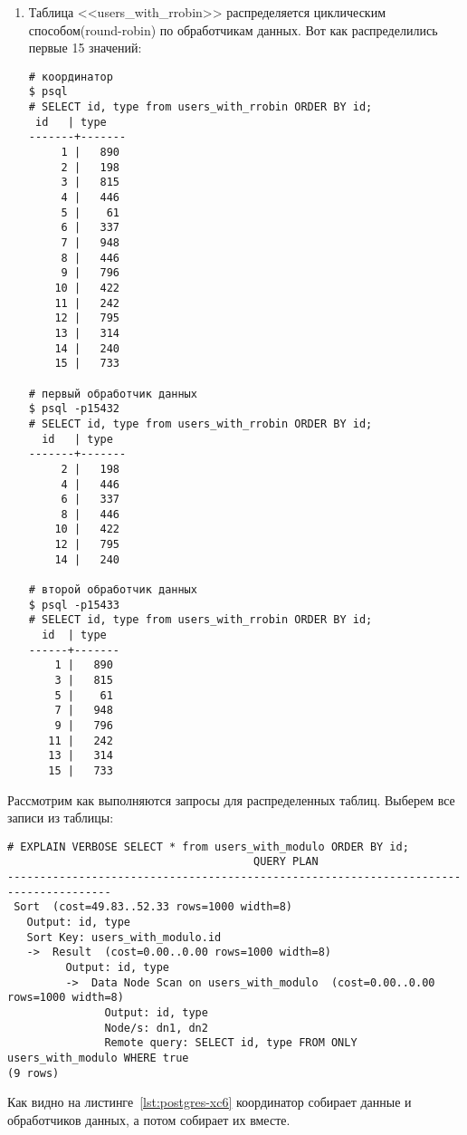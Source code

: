 \begin{enumerate}
\item Таблица <<users\_with\_rrobin>> распределяется циклическим способом(round-robin) по обработчикам данных. Вот как распределились первые 15 значений:

\begin{lstlisting}[label=lst:postgres-xc5,caption=Данные с координатора и обработчиков данных]
# координатор
$ psql
# SELECT id, type from users_with_rrobin ORDER BY id;
 id   | type  
-------+-------
     1 |   890
     2 |   198
     3 |   815
     4 |   446
     5 |    61
     6 |   337
     7 |   948
     8 |   446
     9 |   796
    10 |   422
    11 |   242
    12 |   795
    13 |   314
    14 |   240
    15 |   733

# первый обработчик данных
$ psql -p15432
# SELECT id, type from users_with_rrobin ORDER BY id;
  id   | type  
-------+-------
     2 |   198
     4 |   446
     6 |   337
     8 |   446
    10 |   422
    12 |   795
    14 |   240

# второй обработчик данных
$ psql -p15433 
# SELECT id, type from users_with_rrobin ORDER BY id;
  id  | type  
------+-------
    1 |   890
    3 |   815
    5 |    61
    7 |   948
    9 |   796
   11 |   242
   13 |   314
   15 |   733
\end{lstlisting}

\end{enumerate}

Рассмотрим как выполняются запросы для распределенных таблиц. Выберем все записи из таблицы:

\begin{lstlisting}[label=lst:postgres-xc6,caption=Выборка записей из распределенной таблицы]
# EXPLAIN VERBOSE SELECT * from users_with_modulo ORDER BY id;
                                      QUERY PLAN                                      
--------------------------------------------------------------------------------------
 Sort  (cost=49.83..52.33 rows=1000 width=8)
   Output: id, type
   Sort Key: users_with_modulo.id
   ->  Result  (cost=0.00..0.00 rows=1000 width=8)
         Output: id, type
         ->  Data Node Scan on users_with_modulo  (cost=0.00..0.00 rows=1000 width=8)
               Output: id, type
               Node/s: dn1, dn2
               Remote query: SELECT id, type FROM ONLY users_with_modulo WHERE true
(9 rows)
\end{lstlisting}

Как видно на листинге~\ref{lst:postgres-xc6} координатор собирает данные и обработчиков данных, а потом собирает их вместе. 

